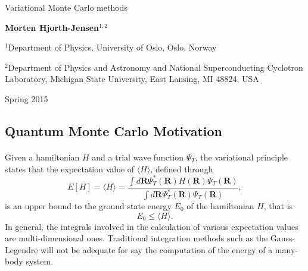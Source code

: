 \documentclass[%
twoside,                 %
final,                   %
10pt]{article}
\begin{document}






\thispagestyle{empty}

\begin{center}
{\LARGE\bf
\begin{spacing}{1.25}
Variational Monte Carlo methods
\end{spacing}
}
\end{center}


\begin{center}
{\bf Morten Hjorth-Jensen${}^{1, 2}$} \\ [0mm]
\end{center}

    \begin{center}
\centerline{{\small ${}^1$Department of Physics, University of Oslo, Oslo, Norway}}
\centerline{{\small ${}^2$Department of Physics and Astronomy and National Superconducting Cyclotron Laboratory, Michigan State University, East Lansing, MI 48824, USA}}
\end{center}
    

\begin{center} %
Spring 2015
\end{center}

\vspace{1cm}


\subsection{Quantum Monte Carlo Motivation}

\paragraph{}
Given a hamiltonian $H$ and a trial wave function $\Psi_T$, the variational principle states that the expectation value of $\langle H \rangle$, defined through 
\[
   E[H]= \langle H \rangle =
   \frac{\int d\bm{R}\Psi^{\ast}_T(\bm{R})H(\bm{R})\Psi_T(\bm{R})}
        {\int d\bm{R}\Psi^{\ast}_T(\bm{R})\Psi_T(\bm{R})},
\]
is an upper bound to the ground state energy $E_0$ of the hamiltonian $H$, that is 
\[
    E_0 \le \langle H \rangle .
\]
In general, the integrals involved in the calculation of various  expectation values  are multi-dimensional ones. Traditional integration methods such as the Gauss-Legendre will not be adequate for say the  computation of the energy of a many-body system.
\end{document}
